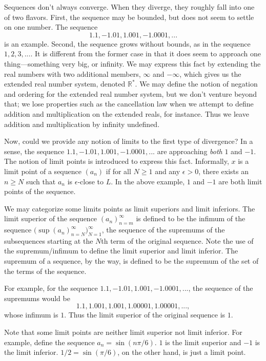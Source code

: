 \documentclass{article}
\newcommand{\real}{{\mathbb{R}}}
\begin{document}
Sequences don't always converge. When they diverge, they roughly fall into one of two flavors. First, the sequence may be bounded, but does not seem to settle on one number. The sequence 
\[1.1, -1.01, 1.001, -1.0001,...\]
is an example. Second, the sequence grows without bounds, as in the sequence $1,2,3,...$. It is different from the former case in that it does seem to approach one thing---something very big, or infinity. We may express this fact by extending the real numbers with two additional members, $\infty$ and $-\infty$, which gives us the extended real number system, denoted $\real^*$. We may define the notion of negation and ordering for the extended real number system, but we don't venture beyond that; we lose properties such as the cancellation law when we attempt to define addition and multiplication on the extended reals, for instance. Thus we leave addition and multiplication by infinity undefined.

Now, could we provide any notion of limits to the first type of divergence? In a sense, the sequence $1.1, -1.01, 1.001, -1.0001,...$ are approaching \textit{both} $1$ and $-1$. The notion of limit points is introduced to express this fact. Informally, $x$ is a limit point of a sequence $(a_n)$ if for all $N \geq 1$ and any $\epsilon > 0$, there exists an $n \geq N$ such that $a_n$ is $\epsilon$-close to $L$. In the above example, $1$ and $-1$ are both limit points of the sequence.

We may categorize some limits points as limit superiors and limit inferiors. The limit superior of the sequence $(a_n)_{n =m}^\infty$ is defined to be the infimum of the sequence $\big( \sup (a_n)_{n=N}^\infty \big )_{N=1}^\infty$, the sequence of the supremums of the subsequences starting at the $N$th term of the original sequence. Note the use of the supremum/infimum to define the limit superior and limit inferior. The supremum of a sequence, by the way, is defined to be the supremum of the set of the terms of the sequence.

For example, for the sequence $1.1, -1.01, 1.001, -1.0001,...$, the sequence of the supremums would be 
\[1.1, 1.001, 1.001, 1.00001, 1.00001, ...,\] 
whose infimum is $1$. Thus the limit superior of the original sequence is $1$.

Note that some limit points are neither limit superior not limit inferior. For example, define the sequence $a_n = \sin(n\pi/6)$. $1$ is the limit superior and $-1$ is the limit inferior. $1/2 = \sin(\pi/6)$, on the other hand, is just a limit point.
\end{document}
